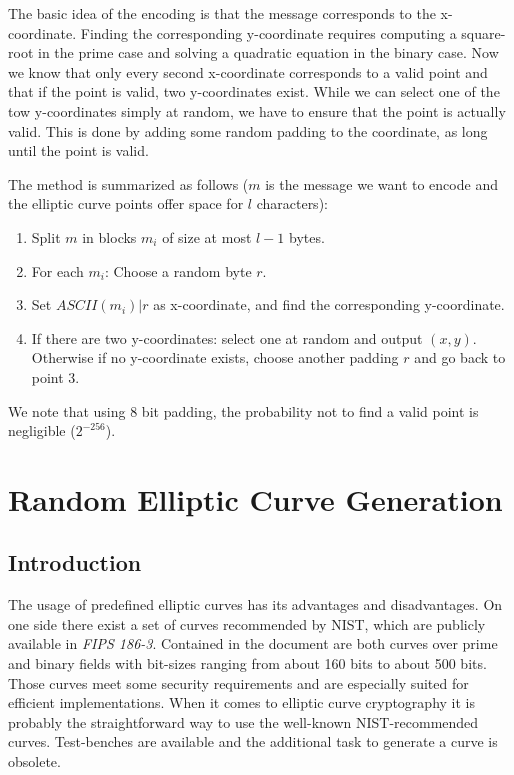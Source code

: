 \documentclass[11pt,english]{article}
\begin{document}
The basic idea of the encoding is that the message corresponds to the x-coordinate. Finding the corresponding y-coordinate requires computing a square-root in the prime case and solving a quadratic equation in the binary case. Now we know that only every second x-coordinate corresponds to a valid point and that if the point is valid, two y-coordinates exist. While we can select one of the tow y-coordinates simply at random, we have to ensure that the point is actually valid. This is done by adding some random padding to the coordinate, as long until the point is valid.

The method is summarized as follows ($m$ is the message we want to encode and the elliptic curve points offer space for $l$ characters):
\begin{enumerate}
 \item Split $m$ in blocks $m_i$ of size at most $l-1$ bytes.
 \item For each $m_i$: Choose a random byte $r$.
 \item Set $ASCII(m_i)|r$ as x-coordinate, and find the corresponding y-coordinate.
 \item If there are two y-coordinates: select one at random and output $(x,y)$. Otherwise if no y-coordinate exists, choose another padding $r$ and go back to point 3.
\end{enumerate}
We note that using 8 bit padding, the probability not to find a valid point is negligible ($2^{-256}$).


\section{Random Elliptic Curve Generation}
\subsection{Introduction}
The usage of predefined elliptic curves has its advantages and disadvantages. On one side there exist a set of curves recommended by NIST, which are publicly available in \emph{FIPS 186-3}.
Contained in the document are both curves over prime and binary fields with bit-sizes ranging from about 160 bits to about 500 bits. Those curves meet some security requirements and are especially suited for efficient implementations.
When it comes to elliptic curve cryptography it is probably the straightforward way to use the well-known NIST-recommended curves. Test-benches are available and the additional task to generate a curve is obsolete.
\end{document}
